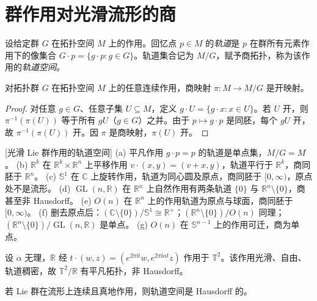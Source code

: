 \documentclass[../../main.tex]{subfiles}
\begin{document}
\section{群作用对光滑流形的商}\label{section:ch21-quotients-by-actions}

设给定群 $G$ 在拓扑空间 $M$ 上的作用。回忆点 $p\in M$ 的\emph{轨道}是 $p$ 在群所有元素作用下的像集合 $G\cdot p=\{g\cdot p\colon g\in G\}$。轨道集合记为 $M/G$，赋予商拓扑，称为该作用的\emph{轨道空间}。

\begin{lemma}\label{lemma:ch21-商映射开}
对拓扑群 $G$ 在拓扑空间 $M$ 上的任意连续作用，商映射 $\pi\colon M\to M/G$ 是开映射。
\end{lemma}

\begin{proof}
对任意 $g\in G$、任意子集 $U\subseteq M$，定义 $g\cdot U=\{g\cdot x\colon x\in U\}$。若 $U$ 开，则 $\pi^{-1}(\pi(U))$ 等于所有 $gU$（$g\in G$）之并。由于 $p\mapsto g\cdot p$ 是同胚，每个 $gU$ 开，故 $\pi^{-1}(\pi(U))$ 开。因 $\pi$ 是商映射，$\pi(U)$ 开。
\end{proof}

\begin{example}{[光滑 Lie 群作用的轨道空间]}\label{example:ch21-轨道空间}
(a) 平凡作用 $g\cdot p=p$ 的轨道是单点集，$M/G=M$。
(b) $\mathbb{R}^k$ 在 $\mathbb{R}^k\times\mathbb{R}^n$ 上平移作用 $v\cdot(x,y)=(v+x,y)$，轨道平行于 $\mathbb{R}^k$，商同胚于 $\mathbb{R}^n$。
(c) $\mathbb{S}^1$ 在 $\mathbb{C}$ 上旋转作用，轨道为同心圆及原点，商同胚于 $[0,\infty)$，原点处不是流形。
(d) $\operatorname{GL}(n,\mathbb{R})$ 在 $\mathbb{R}^n$ 上自然作用有两条轨道 $\{0\}$ 与 $\mathbb{R}^n\setminus\{0\}$，商甚至非 Hausdorff。
(e) $O(n)$ 在 $\mathbb{R}^n$ 上的作用轨道为原点与球面，商同胚于 $[0,\infty)$。
(f) 删去原点后：$(\mathbb{C}\setminus\{0\})/\mathbb{S}^1\cong\mathbb{R}^+$；$(\mathbb{R}^n\setminus\{0\})/O(n)$ 同理；$(\mathbb{R}^n\setminus\{0\})/\operatorname{GL}(n,\mathbb{R})$ 是单点。
(g) $O(n)$ 在 $\mathbb{S}^{n-1}$ 上的作用可迁，商为单点。
\end{example}

\begin{example}\label{example:ch21-无理流}
设 $\alpha$ 无理，$\mathbb{R}$ 经 $t\cdot(w,z)=(e^{2\pi\mathrm{i}t}w,e^{2\pi\mathrm{i}\alpha t}z)$ 作用于 $\mathbb{T}^2$。该作用光滑、自由、轨道稠密，故 $\mathbb{T}^2/\mathbb{R}$ 有平凡拓扑，非 Hausdorff。
\end{example}

\begin{proposition}\label{proposition:ch21-真作用Hausdorff}
若 Lie 群在流形上连续且真地作用，则轨道空间是 Hausdorff 的。
\end{proposition}
\end{document}
